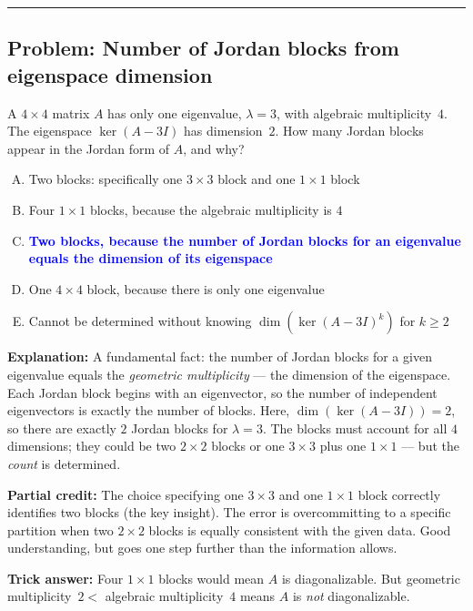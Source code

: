 \documentclass[12pt]{amsart}
\newcommand{\divider}{
  \vspace{-1em}
  \noindent
  \raisebox{-0.15ex}{\textbullet}%
  \hspace{0.5em}%
  \rule[0.5ex]{0.95\textwidth}{1.0pt}%
  \hspace{0.5em}%
  \raisebox{-0.15ex}{\textbullet}%
  \vspace{0em}
}
\begin{document}
\divider

\subsection*{Problem: Number of Jordan blocks from eigenspace dimension}

A $4 \times 4$ matrix $A$ has only one eigenvalue, $\lambda = 3$, with
algebraic multiplicity~$4$. The eigenspace $\ker(A - 3I)$ has dimension~$2$.
How many Jordan blocks appear in the Jordan form of $A$, and why?

\begin{enumerate}[(A)]
\item Two blocks: specifically one $3 \times 3$ block and one $1 \times 1$
      block
\item Four $1 \times 1$ blocks, because the algebraic multiplicity is $4$
\item \textcolor{blue}{\textbf{Two blocks, because the number of Jordan
      blocks for an eigenvalue equals the dimension of its eigenspace}}
\item One $4 \times 4$ block, because there is only one eigenvalue
\item Cannot be determined without knowing $\dim(\ker(A - 3I)^k)$
      for $k \geq 2$
\end{enumerate}

\textbf{Explanation:}
A fundamental fact: the number of Jordan blocks for a given eigenvalue
equals the \emph{geometric multiplicity} --- the dimension of the
eigenspace. Each Jordan block begins with an eigenvector, so the
number of independent eigenvectors is exactly the number of blocks.
Here, $\dim(\ker(A - 3I)) = 2$, so there are exactly $2$ Jordan blocks
for $\lambda = 3$. The blocks must account for all $4$ dimensions;
they could be two $2 \times 2$ blocks or one $3 \times 3$ plus one
$1 \times 1$ --- but the \emph{count} is determined.

\textbf{Partial credit:}
The choice specifying one $3 \times 3$ and one $1 \times 1$ block
correctly identifies two blocks (the key insight). The error is
overcommitting to a specific partition when two $2 \times 2$ blocks is
equally consistent with the given data. Good understanding, but goes
one step further than the information allows.

\textbf{Trick answer:}
Four $1 \times 1$ blocks would mean $A$ is diagonalizable. But
geometric multiplicity~$2 <$ algebraic multiplicity~$4$ means $A$ is
\emph{not} diagonalizable.
\end{document}
